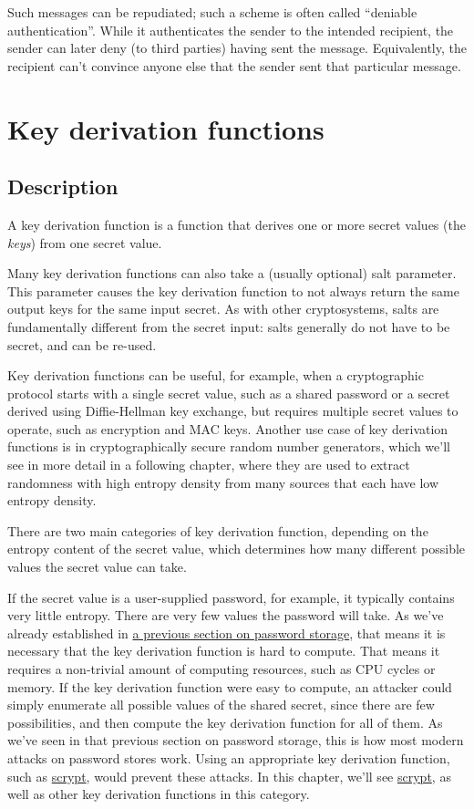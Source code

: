 \documentclass[11pt,ebook,table,dvipsnames]{memoir}
\begin{document}
Such messages can be repudiated; such a scheme is often called
\enquote{deniable authentication}. While it authenticates the sender to the
intended recipient, the sender can later deny (to third parties)
having sent the message. Equivalently, the recipient can't convince
anyone else that the sender sent that particular message.
\chapter{Key derivation functions\label{key-derivation-function}}
\label{sec-2-9}

\section{Description}
\label{sec-2-9-1}

A key derivation function is a function that derives one or more
secret values (the \emph{keys}) from one secret value.

Many key derivation functions can also take a (usually optional)
\gls{salt} parameter. This parameter causes the key derivation
function to not always return the same output keys for the same input
secret. As with other cryptosystems, salts are fundamentally different
from the secret input: salts generally do not have to be secret, and
can be re-used.

Key derivation functions can be useful, for example, when a
cryptographic protocol starts with a single secret value, such as a
shared password or a secret derived using Diffie-Hellman key exchange,
but requires multiple secret values to operate, such as encryption and
MAC keys. Another use case of key derivation functions is in
cryptographically secure random number generators, which we'll see in
more detail in a following chapter, where they are used to extract
randomness with high entropy density from many sources that each have
low entropy density.

There are two main categories of key derivation function, depending on
the entropy content of the secret value, which determines how many
different possible values the secret value can take.

If the secret value is a user-supplied password, for example, it
typically contains very little entropy. There are very few values the
password will take. As we've already established in \hyperref[password-storage]{a previous section
on password storage}, that means it is necessary that the key
derivation function is hard to compute. That means it requires a
non-trivial amount of computing resources, such as CPU cycles or
memory. If the key derivation function were easy to compute, an
attacker could simply enumerate all possible values of the shared
secret, since there are few possibilities, and then compute the key
derivation function for all of them. As we've seen in that previous
section on password storage, this is how most modern attacks on
password stores work. Using an appropriate key derivation function,
such as \hyperref[scrypt]{scrypt}, would prevent these attacks. In this chapter, we'll
see \hyperref[scrypt]{scrypt}, as well as other key derivation functions in this
category.
\end{document}
